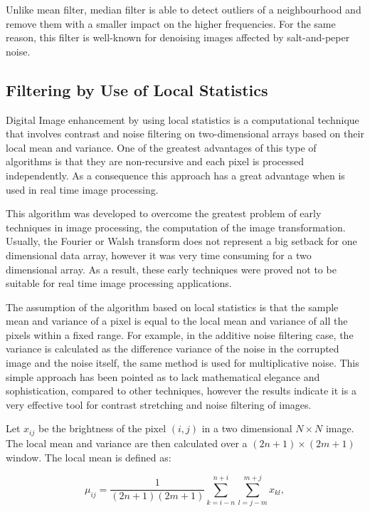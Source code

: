 Unlike mean filter, median filter is able to detect outliers of a neighbourhood and remove them with a smaller impact on the higher frequencies. For the same reason, this filter is well-known for denoising images affected by salt-and-peper noise. 


\subsection{Filtering by Use of Local Statistics}

Digital Image enhancement by using local statistics is a computational technique that involves contrast and noise filtering on two-dimensional arrays based on their local mean and variance. One of the greatest advantages of this type of algorithms is that they are non-recursive and each pixel is processed independently. As a consequence this approach has a great advantage when is used in real time image processing.

This algorithm was developed to overcome the greatest problem of early techniques in image processing, the computation of the image transformation. Usually, the Fourier or Walsh transform does not represent a big setback for one dimensional data array, however it was very time consuming for a two dimensional array. As a result, these early techniques were proved not to be suitable for real time image processing applications.

The assumption of the algorithm based on local statistics is that the sample mean and variance of a pixel is equal to the local mean and variance of all the pixels within a fixed range. For example, in the additive noise filtering case, the variance is calculated as the difference variance of the noise in the corrupted image and the noise itself, the same method is used for multiplicative noise.
This simple approach has been pointed as to lack mathematical elegance and sophistication, compared to other techniques, however the results indicate it is a very effective tool for contrast stretching and noise filtering of images.

Let $x_{ij}$ be the brightness of the pixel $(i,j)$ in a two dimensional $N\times N$ image. The local mean and variance are then calculated over a $(2n+1) \times (2m+1)$ window. The local mean is defined as:

\begin{equation}
    \mu_{ij}=\dfrac{1}{(2n+1)(2m+1)}\sum_{k=i-n}^{n+i}\sum_{l=j-m}^{m+j}{x_{kl}},
    \label{eq:ls_filter_1}
\end{equation}

